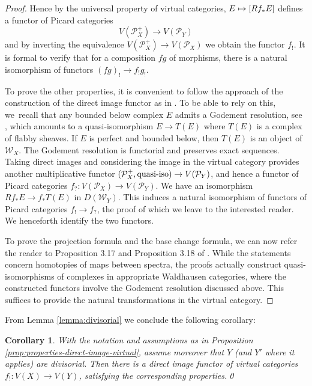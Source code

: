 \documentclass[11pt]{article}
\newcommand\mto{\mathchoice{\longmapsto}{\mapsto}{\mapsto}{\mapsto}}
\theoremstyle{plain}
\newtheorem{corollary}[theorem]{Corollary}
\theoremstyle{definition}
\newcommand{\Pcal}{\mathcal P}
\newcommand{\Wcal}{\mathcal W}
\begin{document}
\begin{proof}
Hence by the universal property of virtual categories, $E \mto [Rf_\ast E]$ defines a functor of Picard categories
\begin{displaymath}
V(\Pcal_{X}^{+}) \to V(\Pcal_{Y})
\end{displaymath}
and by inverting the equivalence $V(\Pcal^+_X) \to V(\Pcal_X)$ we obtain the functor $f_!$. It is formal to verify that for a composition $fg$ of morphisms, there is a natural isomorphism of functors $(fg)_! \to f_! g_! $.

To prove the other properties, it is convenient to follow the approach of the construction of the direct image functor as in \cite[]{ThomasonTrobaugh}. To be able to rely on this, we~recall that any bounded below complex $E$ admits a Godement resolution, see \hbox{\cite[\href{https://stacks.math.columbia.edu/tag/0FKT}{0FKT}]{stacks-project}}, which amounts to a quasi-isomorphism $E\to T(E)$ where $T(E)$ is a complex of flabby sheaves. If $E$ is perfect and bounded below, then $T(E)$ is an object of $\Wcal_{X}$. The Godement resolution is functorial and preserves exact sequences. Taking direct images and considering the image in the virtual category provides another multiplicative functor $(\Pcal_{X}^{+}, \hbox{quasi-iso}) \to V(\Pcal_{Y})$, and hence a functor of Picard categories $f_{?}\colon V(\Pcal_{X})\to V(\Pcal_{Y})$. We have an isomorphism $Rf_\ast E \to f_\ast T(E)$ in $D(\Wcal_{Y})$. This induces a natural isomorphism of functors of Picard categories $f_! \to f_?$, the proof of which we leave to the interested reader. We henceforth identify the two functors.

To prove the projection formula and the base change formula, we can now refer the reader to Proposition 3.17 and Proposition 3.18 of \cite{ThomasonTrobaugh}. While the statements concern homotopies of maps between spectra, the proofs actually construct quasi-isomorphisms of complexes in appropriate Waldhausen categories, where the constructed functors involve the Godement resolution discussed above. This suffices to provide the natural transformations in the virtual category.
\end{proof}

From Lemma \ref{lemma:divisorial} we conclude the following corollary:

\begin{corollary}
With the notation and assumptions as in Proposition \ref{prop:properties-direct-image-virtual}, assu\-me moreover that $Y$ (and $Y'$ where it applies) are divisorial. Then there is a
direct image functor of virtual categories $f_! \colon V(X)\to V(Y)$, satisfying the corresponding properties.\qed
\end{corollary}
\end{document}
